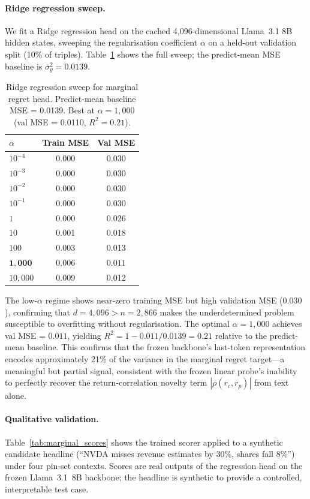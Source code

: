\documentclass{article}
\begin{document}
\paragraph{Ridge regression sweep.}
We fit a Ridge regression head on the cached 4{,}096-dimensional Llama~3.1 8B hidden states, sweeping the regularisation coefficient $\alpha$ on a held-out validation split (10\% of triples).
Table~\ref{tab:ridge} shows the full sweep; the predict-mean MSE baseline is $\sigma^2_y = 0.0139$.

\begin{table}[h]
\centering
\caption{Ridge regression sweep for marginal regret head. Predict-mean baseline MSE = 0.0139. Best at $\alpha = 1{,}000$ (val MSE = 0.0110, $R^2 = 0.21$).}
\label{tab:ridge}
\small
\begin{tabular}{@{}lcc@{}}
\toprule
$\alpha$ & \textbf{Train MSE} & \textbf{Val MSE} \\
\midrule
$10^{-4}$ & 0.000 & 0.030 \\
$10^{-3}$ & 0.000 & 0.030 \\
$10^{-2}$ & 0.000 & 0.030 \\
$10^{-1}$ & 0.000 & 0.030 \\
$1$       & 0.000 & 0.026 \\
$10$      & 0.001 & 0.018 \\
$100$     & 0.003 & 0.013 \\
$\mathbf{1{,}000}$ & $\mathbf{0.006}$ & $\mathbf{0.011}$ \\
$10{,}000$ & 0.009 & 0.012 \\
\bottomrule
\end{tabular}
\end{table}

The low-$\alpha$ regime shows near-zero training MSE but high validation MSE ($0.030$), confirming that $d = 4{,}096 > n = 2{,}866$ makes the underdetermined problem susceptible to overfitting without regularisation.
The optimal $\alpha = 1{,}000$ achieves val MSE = $0.011$, yielding $R^2 = 1 - 0.011/0.0139 = 0.21$ relative to the predict-mean baseline.
This confirms that the frozen backbone's last-token representation encodes approximately 21\% of the variance in the marginal regret target---a meaningful but partial signal, consistent with the frozen linear probe's inability to perfectly recover the return-correlation novelty term $|\rho(r_c, r_p)|$ from text alone.

\paragraph{Qualitative validation.}
Table~\ref{tab:marginal_scores} shows the trained scorer applied to a synthetic candidate headline (``NVDA misses revenue estimates by 30\%, shares fall 8\%'') under four pin-set contexts.
Scores are real outputs of the regression head on the frozen Llama~3.1~8B backbone; the headline is synthetic to provide a controlled, interpretable test case.
\end{document}
